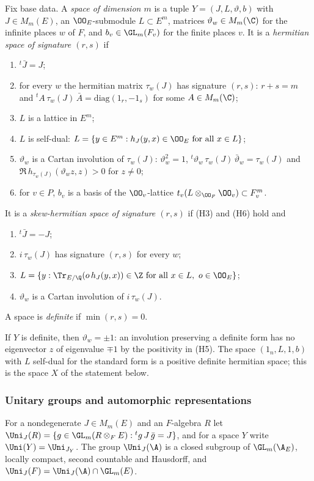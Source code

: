 \begin{definition}\label{pf:tlift:spaces}
Fix base data. A \emph{space of dimension $m$} is a tuple $Y=(J,L,\vartheta,b)$ with $J\in M_m(E)$, an
$\OO_E$-submodule $L\subset E^m$, matrices $\vartheta_w\in M_m(\C)$ for the infinite places $w$ of $F$, and
$b_v\in\GL_m(F_v)$ for the finite places $v$. It is a \emph{hermitian space of signature $(r,s)$} if
\begin{enumerate}[label=(H\arabic*),nosep]
\item ${}^t\bar J=J$;
\item for every $w$ the hermitian matrix $\tau_w(J)$ has signature $(r,s)$: $r+s=m$ and
  ${}^tA\,\tau_w(J)\,\bar A=\mathrm{diag}(1_r,-1_s)$ for some $A\in M_m(\C)$;
\item $L$ is a lattice in $E^m$;
\item $L$ is self-dual: $L=\{y\in E^m:h_J(y,x)\in\OO_E\text{ for all }x\in L\}$;
\item $\vartheta_w$ is a Cartan involution of $\tau_w(J)$: $\vartheta_w^2=1$,
  ${}^t\vartheta_w\,\tau_w(J)\,\bar\vartheta_w=\tau_w(J)$ and $\Re\,h_{\tau_w(J)}(\vartheta_wz,z)>0$ for $z\ne0$;
\item for $v\in P$, $b_v$ is a basis of the $\OO_v$-lattice $t_v(L\otimes_{\OO_F}\OO_v)\subset F_v^m$.
\end{enumerate}
It is a \emph{skew-hermitian space of signature $(r,s)$} if (H3) and (H6) hold and
\begin{enumerate}[label=(S\arabic*),nosep]
\item ${}^t\bar J=-J$;
\item[(S2)] $i\,\tau_w(J)$ has signature $(r,s)$ for every $w$;
\item[(S4)] $L=\{y:\Tr_{E/\Q}(o\,h_J(y,x))\in\Z\text{ for all }x\in L,\ o\in\OO_E\}$;
\item[(S5)] $\vartheta_w$ is a Cartan involution of $i\,\tau_w(J)$.
\end{enumerate}
A space is \emph{definite} if $\min(r,s)=0$.
\end{definition}

If $Y$ is definite, then $\vartheta_w=\pm1$: an involution preserving a definite form has no eigenvector
$z$ of eigenvalue $\mp1$ by the positivity in (H5). The space $(1_n,L,1,b)$ with $L$ self-dual for the
standard form is a positive definite hermitian space; this is the space $X$ of the statement below.

\subsubsection*{Unitary groups and automorphic representations}
For a nondegenerate $J\in M_m(E)$ and an $F$-algebra $R$ let
$\Uni_J(R)=\{g\in\GL_m(R\otimes_FE):{}^tg\,J\,\bar g=J\}$, and for a space $Y$ write
$\Uni(Y)=\Uni_{J_Y}$. The group $\Uni_J(\A)$ is a closed subgroup of $\GL_m(\tliftAE)$, locally compact,
second countable and Hausdorff, and
$\Uni_J(F)=\Uni_J(\A)\cap\GL_m(E)$.

